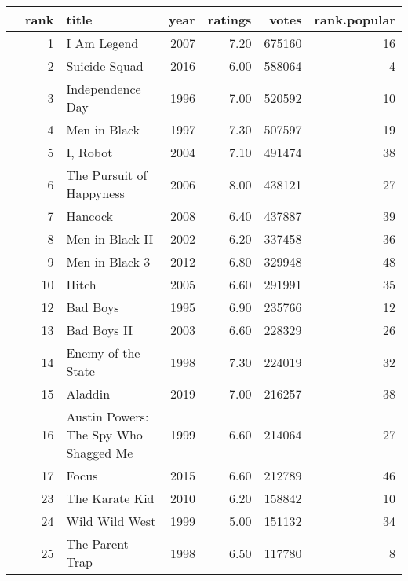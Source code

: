 \begin{table}[ht]
\centering
\begin{tabular}{rrlrrrr}
  \hline
 & rank & title & year & ratings & votes & rank.popular \\ 
  \hline
&   1 & I Am Legend & 2007 & 7.20 & 675160 &  16 \\ 
&   2 & Suicide Squad & 2016 & 6.00 & 588064 &   4 \\ 
&   3 & Independence Day & 1996 & 7.00 & 520592 &  10 \\ 
&   4 & Men in Black & 1997 & 7.30 & 507597 &  19 \\ 
&   5 & I, Robot & 2004 & 7.10 & 491474 &  38 \\ 
&   6 & The Pursuit of Happyness & 2006 & 8.00 & 438121 &  27 \\ 
&   7 & Hancock & 2008 & 6.40 & 437887 &  39 \\ 
&   8 & Men in Black II & 2002 & 6.20 & 337458 &  36 \\ 
&   9 & Men in Black 3 & 2012 & 6.80 & 329948 &  48 \\ 
&  10 & Hitch & 2005 & 6.60 & 291991 &  35 \\ 
&  12 & Bad Boys & 1995 & 6.90 & 235766 &  12 \\ 
&  13 & Bad Boys II & 2003 & 6.60 & 228329 &  26 \\ 
&  14 & Enemy of the State & 1998 & 7.30 & 224019 &  32 \\ 
&  15 & Aladdin & 2019 & 7.00 & 216257 &  38 \\ 
&  16 & Austin Powers: The Spy Who Shagged Me & 1999 & 6.60 & 214064 &  27 \\ 
&  17 & Focus & 2015 & 6.60 & 212789 &  46 \\ 
&  23 & The Karate Kid & 2010 & 6.20 & 158842 &  10 \\ 
&  24 & Wild Wild West & 1999 & 5.00 & 151132 &  34 \\ 
&  25 & The Parent Trap & 1998 & 6.50 & 117780 &   8 \\ 
   \hline
\end{tabular}
\end{table}
